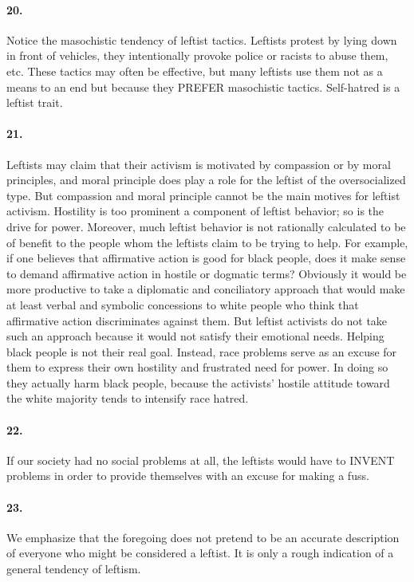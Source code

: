 \documentclass[12pt]{book}
\begin{document}
\paragraph{20.} Notice the masochistic tendency of leftist tactics. Leftists protest by lying down in front of vehicles, they intentionally provoke police or racists to abuse them, etc. These tactics may often be effective, but many leftists use them not as a means to an end but because they PREFER masochistic tactics. Self-hatred is a leftist trait.


\paragraph{21.} Leftists may claim that their activism is motivated by compassion or by moral principles, and moral principle does play a role for the leftist of the oversocialized type. But compassion and moral principle cannot be the main motives for leftist activism. Hostility is too prominent a component of leftist behavior; so is the drive for power. Moreover, much leftist behavior is not rationally calculated to be of benefit to the people whom the leftists claim to be trying to help. For example, if one believes that affirmative action is good for black people, does it make sense to demand affirmative action in hostile or dogmatic terms? Obviously it would be more productive to take a diplomatic and conciliatory approach that would make at least verbal and symbolic concessions to white people who think that affirmative action discriminates against them. But leftist activists do not take such an approach because it would not satisfy their emotional needs. Helping black people is not their real goal. Instead, race problems serve as an excuse for them to express their own hostility and frustrated need for power. In doing so they actually harm black people, because the activists' hostile attitude toward the white majority tends to intensify race hatred.


\paragraph{22.}  If our society had no social problems at all, the leftists would have to INVENT problems in order to provide themselves with an excuse for making a fuss.


\paragraph{23.} We emphasize that the foregoing does not pretend to be an accurate description of everyone who might be considered a leftist. It is only a rough indication of a general tendency of leftism.
\end{document}
